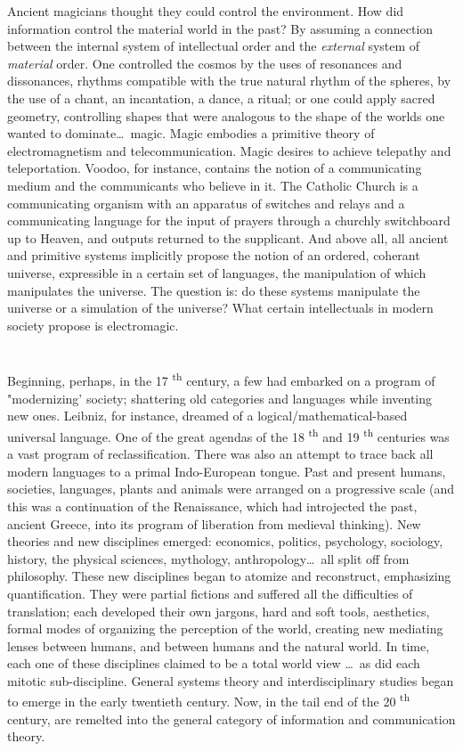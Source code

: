 \documentclass[11pt,twoside,draft]{memoir}
\newcommand{\ts}[1]{
	\textsuperscript{#1}}
\begin{document}
Ancient magicians thought they could
control the environment. How did information 
control the material world in the past?
By assuming a connection between the 
internal system of intellectual order and the 
\emph{external} system of \emph{material} order. One 
controlled the cosmos by the uses of resonances
and dissonances, rhythms compatible with
the true natural rhythm of the spheres, by the
use of a chant, an incantation, a dance, a 
ritual; or one could apply sacred geometry,
controlling shapes that were analogous to
the shape of the worlds one wanted to dominate\ldots\ magic. Magic embodies a primitive
theory of electromagnetism and telecommunication. 
Magic desires to achieve telepathy
and teleportation. Voodoo, for instance, contains 
the notion of a communicating medium
and the communicants who believe in it.
The Catholic Church is a communicating
organism with an apparatus of switches and
relays and a communicating language for
the input of prayers through a churchly
switchboard up to Heaven, and outputs returned 
to the supplicant. And above all, all
ancient and primitive systems implicitly
propose the notion of an ordered, coherant
universe, expressible in a certain set of languages,
the manipulation of which manipulates 
the universe. The question is: do these
systems manipulate the universe or a simulation 
of the universe? What certain intellectuals 
in modern society propose is electromagic.

\chapter{}

Beginning, perhaps, in the 17\ts{th} century, a
few had embarked on a program of "modernizing' society; shattering old categories
and languages while inventing new ones.
Leibniz, for instance, dreamed of a logical\slash mathematical-based universal language. One
of the great agendas of the 18\ts{th} and 19\ts{th}
centuries was a vast program of reclassification. 
There was also an attempt to trace back
all modern languages to a primal Indo-European tongue. Past and present humans,
societies, languages, plants and animals were
arranged on a progressive scale (and this was
a continuation of the Renaissance, which
had introjected the past, ancient Greece, into
its program of liberation from medieval
thinking). New theories and new disciplines
emerged: economics, politics, psychology,
sociology, history, the physical sciences,
mythology, anthropology\ldots\ all split off
from philosophy. These new disciplines began to atomize and reconstruct, emphasizing quantification. They were partial fictions
and suffered all the difficulties of translation; each developed their own jargons, hard
and soft tools, aesthetics, formal modes of
organizing the perception of the world,
creating new mediating lenses between humans, and between humans and the natural
world. In time, each one of these disciplines
claimed to be a total world view \ldots\ as did
each mitotic sub-discipline. General systems
theory and interdisciplinary studies began
to emerge in the early twentieth century.
Now, in the tail end of the 20\ts{th} century, are
remelted into the general category of information and communication theory.
\end{document}
